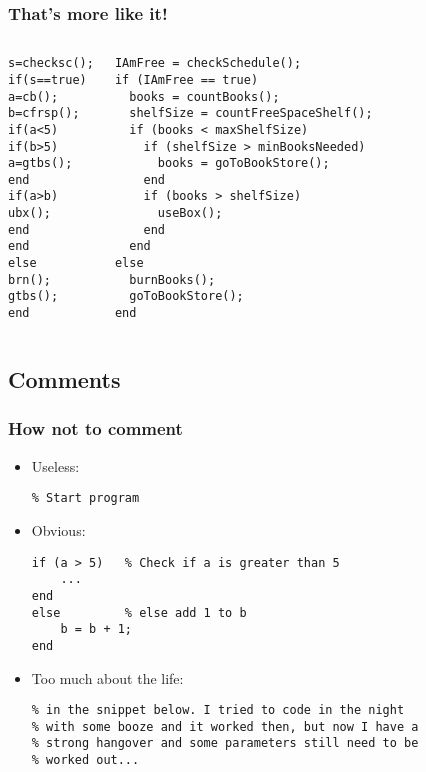 \begin{frame}[fragile]
 \frametitle{That's more like it!}
 \begin{columns}[T]
     \begin{lstlisting}
s=checksc();
if(s==true)
a=cb();
b=cfrsp();
if(a<5)
if(b>5)
a=gtbs();
end
if(a>b)
ubx();
end
end
else
brn();
gtbs();
end
 \end{lstlisting}
     \begin{lstlisting}
IAmFree = checkSchedule();
if (IAmFree == true)
  books = countBooks();
  shelfSize = countFreeSpaceShelf();
  if (books < maxShelfSize)
    if (shelfSize > minBooksNeeded)
      books = goToBookStore();
    end
    if (books > shelfSize)
      useBox();
    end
  end
else
  burnBooks();
  goToBookStore();
end
 \end{lstlisting}
 \end{columns}
\end{frame}

\subsection*{Comments}

\begin{frame}[fragile]
 \frametitle{How not to comment}
 \begin{itemize}[<+->]
  \item Useless:
  \begin{lstlisting}
% Start program 
  \end{lstlisting}
  \item Obvious:
  \begin{lstlisting}
if (a > 5)   % Check if a is greater than 5
    ... 
end
else         % else add 1 to b
    b = b + 1;
end
  \end{lstlisting}
  \item Too much about the life:
  \begin{lstlisting}[basicstyle=\tiny\ttfamily]
% Well... I do not know how to explain what is going on
% in the snippet below. I tried to code in the night 
% with some booze and it worked then, but now I have a 
% strong hangover and some parameters still need to be
% worked out...
  \end{lstlisting}
 \end{itemize}
\end{frame}

